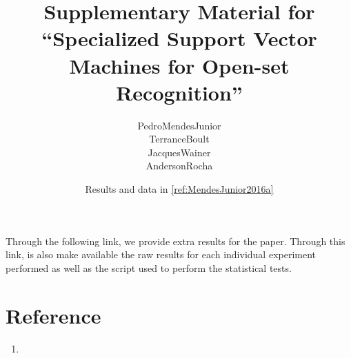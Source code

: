 



\renewcommand\highlightauthorname[1]{#1}

\title{Supplementary Material for ``Specialized Support Vector Machines for Open-set Recognition''}
\author{\gls{PedroMendesJunior}\\%
  \gls{TerranceBoult}\\%
  \gls{JacquesWainer}\\%
  \gls{AndersonRocha}\\%
}
\date{Results and data in \ref{ref:MendesJunior2016a}}



\maketitle

Through the following link, we provide extra results for the paper.
Through this link, is also make available the raw results for each individual experiment performed as well as the script used to perform the statistical tests.

\begin{center}
\end{center}

\section*{Reference}

\begin{enumerate}
\item{}
\end{enumerate}




